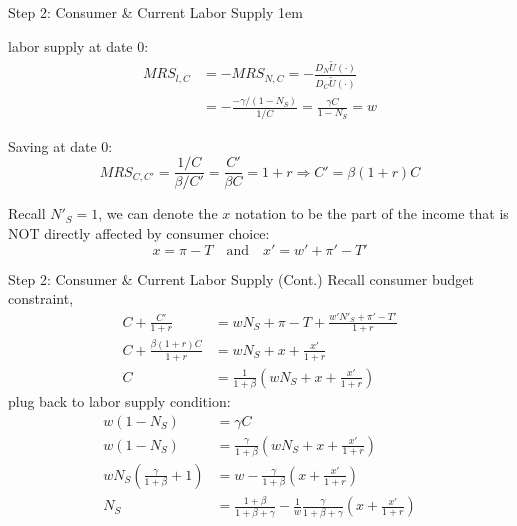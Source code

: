 \documentclass[11pt,aspectratio=43]{beamer}
\let\olditemize=\itemize
\let\endolditemize=\enditemize
\renewenvironment{itemize}{\olditemize \itemsep1em}{\endolditemize}
\theoremstyle{definition}
\begin{document}
\begin{frame}{Step 2: Consumer \& Current Labor Supply}
\label{slide:Step_2__Consumer_Analysis}
    \begin{itemize}
        \item \alert{labor supply} at date 0:
        \begin{align*}
           MRS_{l, C}
                & = -MRS_{N, C} = -\frac{D_{N} \tilde{U}( \cdot )}{D_{C} \tilde{U}( \cdot )}
            \\
                & = -\frac{-\gamma/( 1-N_{S} )}{1/C} = \frac{\gamma C}{1-N_{S}} = w
        \end{align*}
        \item \alert{Saving} at date 0:
        \begin{equation*}
            MRS_{C, C'} = \frac{1/C}{\beta/C'} = \frac{C'}{\beta C} = 1+r \Rightarrow C' = \beta( 1+r ) C
        \end{equation*}
        \item Recall $ N'_{S} = 1$, we can denote the $ x $ notation to be the part of the income that is NOT \alert{directly affected by consumer choice}:
        \begin{equation*}
            x = \pi - T \quad \text{and} \quad x' = w' + \pi' - T'
        \end{equation*}
    \end{itemize}
\end{frame}

\begin{frame}{Step 2: Consumer \& Current Labor Supply (Cont.)}
\label{slide:Step_2__Consumer_Analysis_for_Current_Labor_Supply__Cont__}
\footnotesize
Recall consumer budget constraint,
%
\begin{align*}
    C + \frac{C'}{1+r}
        & = w N_{S} + \pi - T
        + \frac{ w' N'_{S} + \pi' - T' }{1+r}
    \\
    C + \frac{\beta( 1+r )C}{1+r}
        & = wN_{S} + x + \frac{x'}{1+r}
    \\
    C
        & = \frac{1}{1+\beta}
            \left(
                w N_{S} + x + \frac{x'}{1+r}
            \right)
\end{align*}
%
plug back to labor supply condition:
%
\begin{align*}
    w( 1-N_{S} )
        & = \gamma C
    \\
    w( 1-N_{S} )
        &= \frac{\gamma}{1+\beta}
            \left(
                w N_{S} + x + \frac{x'}{1+r}
            \right)
    \\
    w N_{S} \left(
        \frac{\gamma}{1+\beta} + 1
    \right)
        & = w - \frac{\gamma}{1+\beta} \left(
            x + \frac{x'}{1+r}
        \right)
    \\
    N_{S}
        &= \frac{1+\beta}{1+\beta+\gamma} - \frac{1}{w} \frac{\gamma}{1+\beta+\gamma}\left(
            x + \frac{x'}{1+r}
        \right)
\end{align*}
%
\end{frame}
\end{document}
